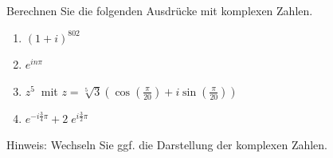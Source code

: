 \begin{ExerciseBlock}
Berechnen Sie die folgenden Ausdrücke mit komplexen Zahlen.

\begin{enumerate}[label=\alph*)]
	\item $(1+i)^{802}$
	\item $e^{i n \pi}$
	\item $z^5 \ $ mit $z = \sqrt[5]{3} \left( \cos\left(\frac{\pi}{20}\right) + i \sin\left(\frac{\pi}{20}\right) \right)$
	\item $e^{-i \frac{3}{4}\pi} + 2 \; e^{i \frac{3}{2}\pi}$
\end{enumerate}

Hinweis: Wechseln Sie ggf. die Darstellung der komplexen Zahlen.

\end{ExerciseBlock}
